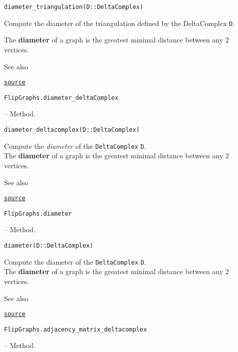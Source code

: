 \begin{adjustwidth}{2em}{0pt}


\begin{verbatim}
diameter_triangulation(D::DeltaComplex)
\end{verbatim}

Compute the diameter of the triangulation defined by the DeltaComplex \texttt{D}.

The \textbf{diameter} of a graph is the greatest minimal distance between any 2 vertices.

See also 



\href{https://github.com/schto223/FlipGraphs.jl/blob/e35d43698a06b86273148826b79d585ba04fcd26/src/deltaComplex.jl#L511-L519}{\texttt{source}}


\end{adjustwidth}
\hypertarget{17984212332069823233}{\texttt{FlipGraphs.diameter\_deltaComplex}}  -- {Method.}

\begin{adjustwidth}{2em}{0pt}


\begin{verbatim}
diameter_deltacomplex(D::DeltaComplex)
\end{verbatim}

Compute the \emph{diameter} of the \texttt{DeltaComplex} \texttt{D}.\\
 The \textbf{diameter} of a graph is the greatest minimal distance between any 2 vertices.

See also 



\href{https://github.com/schto223/FlipGraphs.jl/blob/e35d43698a06b86273148826b79d585ba04fcd26/src/deltaComplex.jl#L483-L491}{\texttt{source}}


\end{adjustwidth}
\hypertarget{8391561643002151248}{\texttt{FlipGraphs.diameter}}  -- {Method.}

\begin{adjustwidth}{2em}{0pt}


\begin{verbatim}
diameter(D::DeltaComplex)
\end{verbatim}

Compute the diameter of the \texttt{DeltaComplex} \texttt{D}.\\
 The \textbf{diameter} of a graph is the greatest minimal distance between any 2 vertices.

See also 



\href{https://github.com/schto223/FlipGraphs.jl/blob/e35d43698a06b86273148826b79d585ba04fcd26/src/deltaComplex.jl#L496-L504}{\texttt{source}}


\end{adjustwidth}
\hypertarget{16623789823786931701}{\texttt{FlipGraphs.adjacency\_matrix\_deltacomplex}}  -- {Method.}

